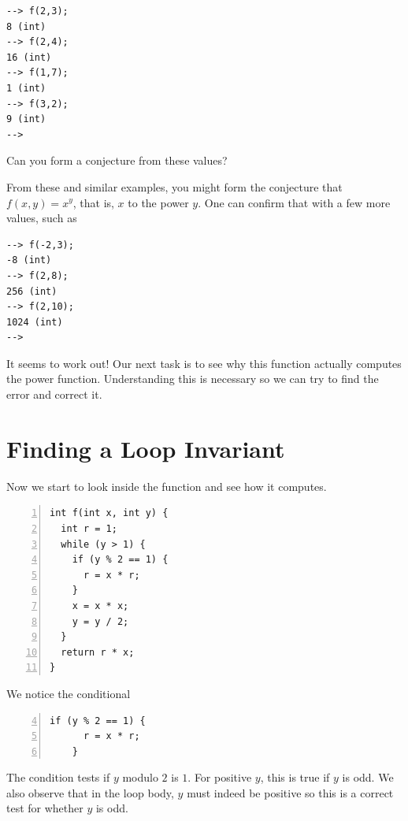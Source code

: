 \begin{lstlisting}[language={[coin]C}]
--> f(2,3);
8 (int)
--> f(2,4);
16 (int)
--> f(1,7);
1 (int)
--> f(3,2);
9 (int)
-->
\end{lstlisting}

\begin{gram}[Question]
Can you form a conjecture from these values?
\end{gram}

\clearpage
From these and similar examples, you might form the
conjecture that $f(x,y) = x^y$, that is, $x$ to the power $y$.
One can confirm that with a few more values, such as

\begin{lstlisting}[language={[coin]C}]
--> f(-2,3);
-8 (int)
--> f(2,8);
256 (int)
--> f(2,10);
1024 (int)
-->
\end{lstlisting}

It seems to work out!  Our next task is to see why this function
actually computes the power function.  Understanding this is
necessary so we can try to find the error and correct it.

\clearpage
\section{Finding a Loop Invariant}
\label{sec:contracts:loop_invariant}

Now we start to look inside the function and see how it
computes.
\begin{lstlisting}[language={[C0]C}, numbers=left]
int f(int x, int y) {
  int r = 1;
  while (y > 1) {
    if (y % 2 == 1) {
      r = x * r;
    }
    x = x * x;
    y = y / 2;
  }
  return r * x;
}
\end{lstlisting}
%
We notice the conditional
%
\begin{lstlisting}[language={[C0]C}, numbers=left, firstnumber=4]
    if (y % 2 == 1) {
      r = x * r;
    }
\end{lstlisting}
The condition tests if $y$ modulo $2$ is $1$.  For positive $y$, this
is true if $y$ is odd.  We also observe that in the loop body, $y$
must indeed be positive so this is a correct test for whether $y$ is
odd.

